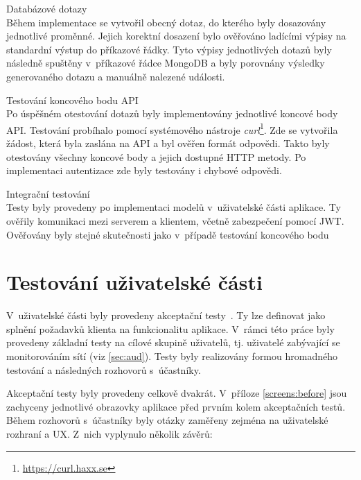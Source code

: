 \begin{description}
    \item Databázové dotazy\\
        Během implementace se vytvořil obecný dotaz, do kterého byly dosazovány jednotlivé proměnné. Jejich korektní dosazení bylo ověřováno ladícími výpisy na standardní výstup do příkazové řádky. Tyto výpisy jednotlivých dotazů byly následně spuštěny v~příkazové řádce MongoDB a byly porovnány výsledky generovaného dotazu a manuálně nalezené události.

    \item Testování koncového bodu API\\
        Po úspěšném otestování dotazů byly implementovány jednotlivé koncové body API. Testování probíhalo pomocí systémového nástroje \textit{curl}\footnote{\url{https://curl.haxx.se}}. Zde se vytvořila žádost, která byla zaslána na API a byl ověřen formát odpovědi. Takto byly otestovány všechny koncové body a jejich dostupné HTTP metody. Po implementaci autentizace zde byly testovány i chybové odpovědi.

    \item Integrační testování\\
        Testy byly provedeny po implementaci modelů v~uživatelské části aplikace. Ty ověřily komunikaci mezi serverem a klientem, včetně zabezpečení pomocí JWT. Ověřovány byly stejné skutečnosti jako v~případě testování koncového bodu

\end{description}

\section{Testování uživatelské části}

V~uživatelské části byly provedeny akceptační testy~\cite{acp:tests}. Ty lze definovat jako splnění požadavků klienta na funkcionalitu aplikace. V~rámci této práce byly provedeny základní testy na cílové skupině uživatelů, tj. uživatelé zabývající se monitorováním sítí (viz \ref{sec:aud}). Testy byly realizovány formou hromadného testování a následných rozhovorů s~účastníky.

Akceptační testy byly provedeny celkově dvakrát. V~příloze \ref{screens:before} jsou zachyceny jednotlivé obrazovky aplikace před prvním kolem akceptačních testů. Během rozhovorů s~účastníky byly otázky zaměřeny zejména na uživatelské rozhraní a UX. Z~nich vyplynulo několik závěrů:

